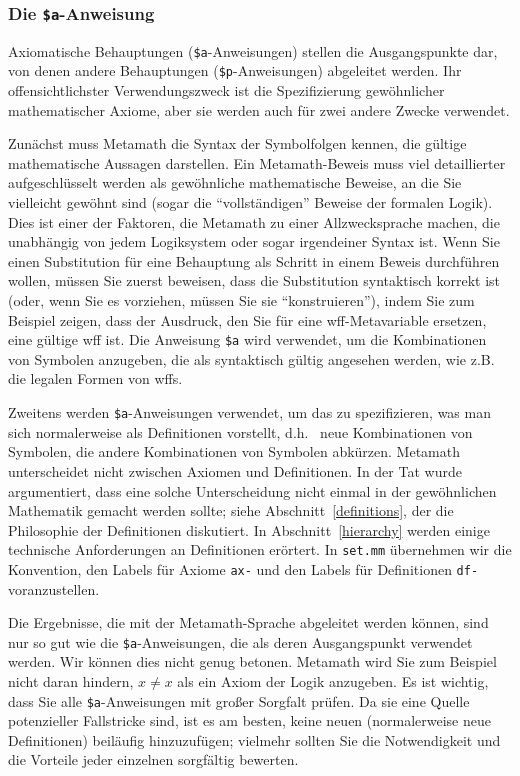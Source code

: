\subsubsection{Die \texttt{\$a}-Anweisung}

Axiomatische Behauptungen (\texttt{\$a}-Anweisungen) stellen die Ausgangspunkte dar, von denen andere Behauptungen (\texttt{\$p}-Anweisungen) abgeleitet werden.  Ihr offensichtlichster Verwendungszweck ist die Spezifizierung gewöhnlicher mathematischer Axiome, aber sie werden auch für zwei andere Zwecke verwendet.

Zunächst muss Metamath die Syntax der Symbolfolgen kennen, die gültige mathematische Aussagen darstellen.  Ein Metamath-Beweis muss viel detaillierter aufgeschlüsselt werden als gewöhnliche mathematische Beweise, an die Sie vielleicht gewöhnt sind (sogar die "`vollständigen"' Beweise der formalen Logik).  Dies ist einer der Faktoren, die Metamath zu einer Allzwecksprache machen, die unabhängig von jedem Logiksystem oder sogar irgendeiner Syntax ist.  Wenn Sie einen Substitution für eine Behauptung als Schritt in einem Beweis durchführen wollen, müssen Sie zuerst beweisen, dass die Substitution syntaktisch korrekt ist (oder, wenn Sie es vorziehen, müssen Sie sie "`konstruieren"'), indem Sie zum Beispiel zeigen, dass der Ausdruck, den Sie für eine wff-Metavariable ersetzen, eine gültige wff ist. Die Anweisung \texttt{\$a} wird verwendet, um die Kombinationen von Symbolen anzugeben, die als syntaktisch gültig angesehen werden, wie z.B. die legalen Formen von wffs.

Zweitens werden \texttt{\$a}-Anweisungen verwendet, um das zu spezifizieren, was man sich normalerweise als Definitionen vorstellt, d.h. \ neue Kombinationen von Symbolen, die andere Kombinationen von Symbolen abkürzen.  Metamath unterscheidet nicht zwischen Axiomen und Definitionen. In der Tat wurde argumentiert, dass eine solche Unterscheidung nicht einmal in der gewöhnlichen Mathematik gemacht werden sollte; siehe Abschnitt~\ref{definitions}, der die Philosophie der Definitionen diskutiert.  In Abschnitt~\ref{hierarchy} werden einige technische Anforderungen an Definitionen erörtert.  In \texttt{set.mm} übernehmen wir die Konvention, den Labels für Axiome \texttt{ax-} und den Labels für Definitionen \texttt{df-} voranzustellen.

Die Ergebnisse, die mit der Metamath-Sprache abgeleitet werden können, sind nur so gut wie die \texttt{\$a}-Anweisungen, die als deren Ausgangspunkt verwendet werden.  Wir können dies nicht genug betonen.  Metamath wird Sie zum Beispiel nicht daran hindern, $x\neq x$ als ein Axiom der Logik anzugeben.  Es ist wichtig, dass Sie alle \texttt{\$a}-Anweisungen mit großer Sorgfalt prüfen. Da sie eine Quelle potenzieller Fallstricke sind, ist es am besten, keine neuen (normalerweise neue Definitionen) beiläufig hinzuzufügen; vielmehr sollten Sie die Notwendigkeit und die Vorteile jeder einzelnen sorgfältig bewerten.

